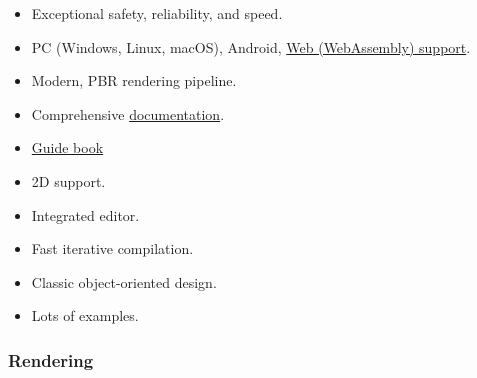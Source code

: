 \documentclass[
]{book}
\providecommand{\tightlist}{%
  \setlength{\itemsep}{0pt}\setlength{\parskip}{0pt}}
\theoremstyle{definition}
\theoremstyle{definition}
\theoremstyle{definition}
\theoremstyle{definition}
\theoremstyle{remark}
\begin{document}
\begin{itemize}
\tightlist
\item
  Exceptional safety, reliability, and speed.
\item
  PC (Windows, Linux, macOS), Android, \href{https://fyrox.rs/examples}{Web (WebAssembly) support}.
\item
  Modern, PBR rendering pipeline.
\item
  Comprehensive \href{https://docs.rs/Fyrox}{documentation}.
\item
  \href{https://fyrox-book.github.io}{Guide book}
\item
  2D support.
\item
  Integrated editor.
\item
  Fast iterative compilation.
\item
  Classic object-oriented design.
\item
  Lots of examples.
\end{itemize}

\subsubsection{Rendering}\label{rendering}
\end{document}
